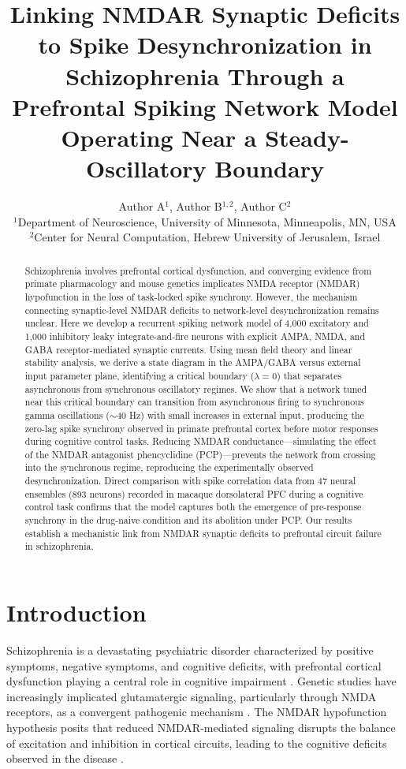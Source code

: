 \documentclass[11pt]{article}
\title{Linking NMDAR Synaptic Deficits to Spike Desynchronization in Schizophrenia Through a Prefrontal Spiking Network Model Operating Near a Steady-Oscillatory Boundary}
\author{Author A$^{1}$, Author B$^{1,2}$, Author C$^{2}$ \\
\small $^{1}$Department of Neuroscience, University of Minnesota, Minneapolis, MN, USA \\
\small $^{2}$Center for Neural Computation, Hebrew University of Jerusalem, Israel}
\date{}
\begin{document}
\maketitle

\begin{abstract}
Schizophrenia involves prefrontal cortical dysfunction, and converging evidence from primate pharmacology and mouse genetics implicates NMDA receptor (NMDAR) hypofunction in the loss of task-locked spike synchrony. However, the mechanism connecting synaptic-level NMDAR deficits to network-level desynchronization remains unclear. Here we develop a recurrent spiking network model of 4,000 excitatory and 1,000 inhibitory leaky integrate-and-fire neurons with explicit AMPA, NMDA, and GABA receptor-mediated synaptic currents. Using mean field theory and linear stability analysis, we derive a state diagram in the AMPA/GABA versus external input parameter plane, identifying a critical boundary ($\lambda = 0$) that separates asynchronous from synchronous oscillatory regimes. We show that a network tuned near this critical boundary can transition from asynchronous firing to synchronous gamma oscillations ($\sim$40 Hz) with small increases in external input, producing the zero-lag spike synchrony observed in primate prefrontal cortex before motor responses during cognitive control tasks. Reducing NMDAR conductance---simulating the effect of the NMDAR antagonist phencyclidine (PCP)---prevents the network from crossing into the synchronous regime, reproducing the experimentally observed desynchronization. Direct comparison with spike correlation data from 47 neural ensembles (893 neurons) recorded in macaque dorsolateral PFC during a cognitive control task confirms that the model captures both the emergence of pre-response synchrony in the drug-naive condition and its abolition under PCP. Our results establish a mechanistic link from NMDAR synaptic deficits to prefrontal circuit failure in schizophrenia.
\end{abstract}

\section{Introduction}

Schizophrenia is a devastating psychiatric disorder characterized by positive symptoms, negative symptoms, and cognitive deficits, with prefrontal cortical dysfunction playing a central role in cognitive impairment \citep{lewis2012cortical, uhlhaas2010neural}. Genetic studies have increasingly implicated glutamatergic signaling, particularly through NMDA receptors, as a convergent pathogenic mechanism \citep{schizophrenia2014biological}. The NMDAR hypofunction hypothesis posits that reduced NMDAR-mediated signaling disrupts the balance of excitation and inhibition in cortical circuits, leading to the cognitive deficits observed in the disease \citep{javitt2012nmda}.
\end{document}
